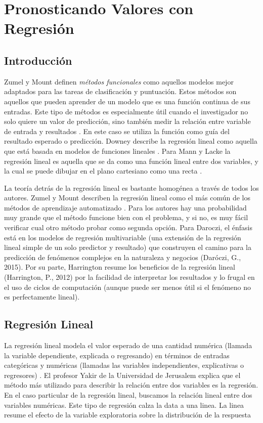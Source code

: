 \documentclass[letterpaper, spanish, 11pt]{report}
\begin{document}
\chapter*{Pronosticando Valores con Regresión}

\section{Introducción}
Zumel y Mount definen \emph{métodos funcionales} como aquellos modelos mejor adaptados para las tareas de clasificación y puntuación. Estos métodos son aquellos que pueden aprender de un modelo que es una función continua de sus entradas. Este tipo de métodos es especialmente útil cuando el investigador no solo quiere un valor de predicción, sino también medir la relación entre variable de entrada y resultados \cite{zumelMount}. En este caso se utiliza la función como guía del resultado esperado o predicción. Downey describe la regresión lineal como aquella que está basada en modelos de funciones lineales \cite{thinkStats}. Para Mann y Lacke la regresión lineal es aquella que se da como una función lineal entre dos variables, y la cual se puede dibujar en el plano cartesiano como una recta \cite{intoStats7}.

La teoría detrás de la regresión lineal es bastante homogénea a través de todos los autores. Zumel y Mount describen la regresión lineal como el más común de los métodos de aprendizaje automatizado \cite{zumelMount}. Para los autores hay una probabilidad muy grande que el método funcione bien con el problema, y si no, es muy fácil verificar cual otro método probar como segunda opción. Para Daroczi, el énfasis está en los modelos de regresión multivariable (una extensión de la regresión lineal simple de un solo predictor y resultado) que construyen el camino para la predicción de fenómenos complejos en la naturaleza y negocios (Daróczi, G., 2015). Por su parte, Harrington resume los beneficios de la regresión lineal (Harrington, P., 2012) por la facilidad de interpretar los resultados y lo frugal en el uso de ciclos de computación (aunque puede ser menos útil si el fenómeno no es perfectamente lineal).

\section{Regresión Lineal}
La regresión lineal modela el valor esperado de una cantidad numérica (llamada la variable dependiente, explicada o regresando) en términos de entradas categóricas y numéricas (llamadas las variables independientes, explicativas o regresores) \cite{zumelMount}. El profesor Yakir de la Universidad de Jerusalem explica que el método más utilizado para describir la relación entre dos variables es la regresión. En el caso particular de la regresión lineal, buscamos la relación lineal entre dos variables numéricas. Este tipo de regresión calza la data a una linea. La linea resume el efecto de la variable exploratoria sobre la distribución de la respuesta \cite{yakir}
\end{document}
